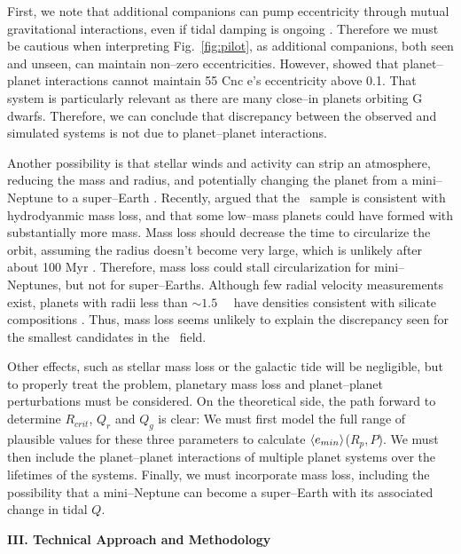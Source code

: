 \medskip
{\centerline{}}
\smallskip

First, we note that additional companions can pump eccentricity
through mutual gravitational interactions, even if tidal damping is
ongoing \citep{MardlingLin02,Bolmont13}.  Therefore we must
be cautious when interpreting Fig.~\ref{fig:pilot}, as additional
companions, both seen and unseen, can maintain non--zero
eccentricities.  However, \cite{Bolmont13} showed that planet--planet
interactions cannot maintain 55 Cnc e's eccentricity above 0.1.  That
system is particularly relevant as there are many close--in planets
orbiting G dwarfs.  Therefore, we can conclude that discrepancy
between the observed and simulated systems is not due to
planet--planet interactions.

Another possibility is that stellar winds and activity can strip an
atmosphere, reducing the mass and radius, and potentially changing the
planet from a mini--Neptune to a super--Earth
\citep{Jackson10,Valencia10,Leitzinger11,Poppenhaeger12}.  Recently,
\cite{OwenWu13} argued that the \kepler~sample is consistent with
hydrodyanmic mass loss, and that some low--mass planets could have
formed with substantially more mass.  Mass loss should decrease the
time to circularize the orbit, assuming the radius doesn't become very
large, which is unlikely after about 100 Myr \citep{Lopez12}.
Therefore, mass loss could stall circularization for mini--Neptunes,
but not for super--Earths.  Although few radial velocity measurements
exist, planets with radii less than $\sim 1.5$~\rearth~ have densities
consistent with silicate compositions \citep{Batalha10}.  Thus, mass
loss seems unlikely to explain the discrepancy seen for the smallest
candidates in the \kepler~field.

Other effects, such as stellar mass loss or the galactic tide will be
negligible, but to properly treat the problem, planetary mass loss and
planet--planet perturbations must be considered.  On the theoretical
side, the path forward to determine $R_{crit}$, $Q_{r}$ and $Q_{g}$ is
clear: We must first model the full range of plausible values for
these three parameters to calculate $\left< e_{min} \right>$($R_p,P$).  We must
then include the planet--planet interactions of multiple planet
systems over the lifetimes of the systems.  Finally, we must
incorporate mass loss, including the possibility that a mini--Neptune
can become a super--Earth with its associated change in tidal $Q$.

\bigskip
\centerline{\bf III. Technical Approach and Methodology}
\smallskip


